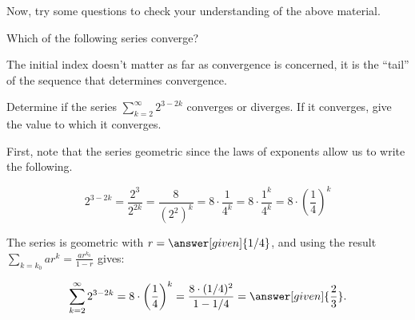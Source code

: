 \documentclass{ximera}
\begin{document}
Now, try some questions to check your understanding of the above material.

\begin{question}
  Which of the following series converge?
  \begin{selectAll}
  \end{selectAll}
  \begin{hint}
    The initial index doesn't matter as far as convergence is
    concerned, it is the ``tail'' of the sequence that determines
    convergence.
  \end{hint}
\end{question}

\begin{question}
Determine if the series $\sum_{k=2}^{\infty} 2^{3-2k}$ converges or diverges.  If it converges, give the value to which it converges.

\begin{explanation}
First, note that the series  geometric since the laws of exponents allow us to write the following.

\[
2^{3-2k} = \frac{2^3}{2^{2k}} = \frac{8}{\left(2^2\right)^k} =  8 \cdot \frac{1}{4^k} =  8 \cdot \frac{1^k}{4^k} =  8 \cdot \left(\frac{1}{4}\right)^k
\]

The series is geometric with $r = \answer[given]{1/4}$, and using the result $\sum_{k=k_0} ar^k = \frac{ar^{k_0}}{1-r}$ gives:

\[
\sum_{k=2}^{\infty} 2^{3-2k} =  8 \cdot \left(\frac{1}{4}\right)^k =  \frac{8 \cdot (1/4)^2}{1-1/4}  =  \answer[given]{\frac{2}{3}}.
\]
\end{explanation}

\end{question}
\end{document}
